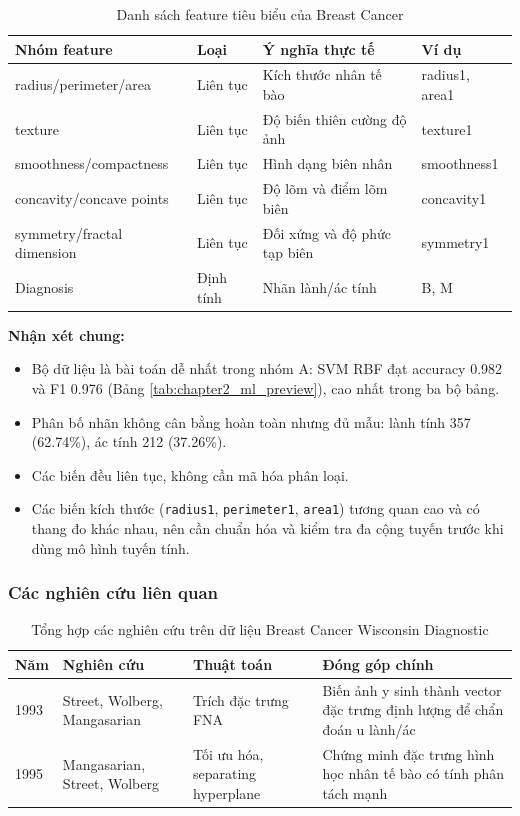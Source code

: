 \begin{table}[H]
\centering
\caption{Danh sách feature tiêu biểu của Breast Cancer}
\label{tab:breast_feature_dictionary}
\small
\begin{tabular}{llll}
\toprule
Nhóm feature & Loại & Ý nghĩa thực tế & Ví dụ \\
\midrule
radius/perimeter/area & Liên tục & Kích thước nhân tế bào & radius1, area1 \\
texture & Liên tục & Độ biến thiên cường độ ảnh & texture1 \\
smoothness/compactness & Liên tục & Hình dạng biên nhân & smoothness1 \\
concavity/concave points & Liên tục & Độ lõm và điểm lõm biên & concavity1 \\
symmetry/fractal dimension & Liên tục & Đối xứng và độ phức tạp biên & symmetry1 \\
Diagnosis & Định tính & Nhãn lành/ác tính & B, M \\
\bottomrule
\end{tabular}
\end{table}

\textbf{Nhận xét chung:}
\begin{itemize}
 \item Bộ dữ liệu là bài toán dễ nhất trong nhóm A: SVM RBF đạt accuracy 0.982 và F1 0.976 (Bảng \ref{tab:chapter2_ml_preview}), cao nhất trong ba bộ bảng.
 \item Phân bố nhãn không cân bằng hoàn toàn nhưng đủ mẫu: lành tính 357 (62.74\%), ác tính 212 (37.26\%).
 \item Các biến đều liên tục, không cần mã hóa phân loại.
 \item Các biến kích thước (\texttt{radius1}, \texttt{perimeter1}, \texttt{area1}) tương quan cao và có thang đo khác nhau, nên cần chuẩn hóa và kiểm tra đa cộng tuyến trước khi dùng mô hình tuyến tính.
\end{itemize}

\subsubsection{Các nghiên cứu liên quan}

\begin{table}[H]
\centering
\caption{Tổng hợp các nghiên cứu trên dữ liệu Breast Cancer Wisconsin Diagnostic}
\label{tab:breast_research_review}
\small
\begin{tabular}{p{}p{}p{}p{}}
\toprule
Năm & Nghiên cứu & Thuật toán & Đóng góp chính \\
\midrule
1993 & Street, Wolberg, Mangasarian \cite{Street1993NuclearFeatures} & Trích đặc trưng FNA & Biến ảnh y sinh thành vector đặc trưng định lượng để chẩn đoán u lành/ác \\
1995 & Mangasarian, Street, Wolberg \cite{Mangasarian1995BreastCancer} & Tối ưu hóa, separating hyperplane & Chứng minh đặc trưng hình học nhân tế bào có tính phân tách mạnh \\
\bottomrule
\end{tabular}
\end{table}

